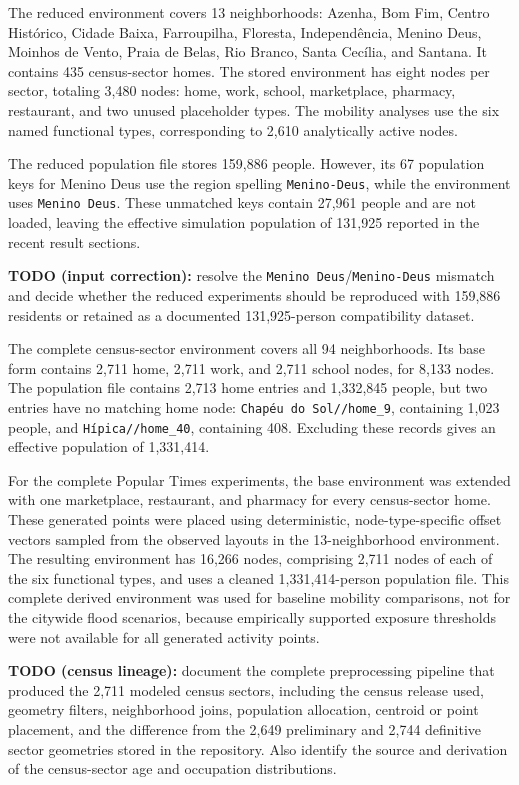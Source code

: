 The reduced environment covers 13 neighborhoods: Azenha, Bom Fim, Centro Hist\'orico, Cidade Baixa, Farroupilha, Floresta, Independ\^encia, Menino Deus, Moinhos de Vento, Praia de Belas, Rio Branco, Santa Cec\'ilia, and Santana. It contains 435 census-sector homes. The stored environment has eight nodes per sector, totaling 3,480 nodes: home, work, school, marketplace, pharmacy, restaurant, and two unused placeholder types. The mobility analyses use the six named functional types, corresponding to 2,610 analytically active nodes.

The reduced population file stores 159,886 people. However, its 67 population keys for Menino Deus use the region spelling \texttt{Menino-Deus}, while the environment uses \texttt{Menino Deus}. These unmatched keys contain 27,961 people and are not loaded, leaving the effective simulation population of 131,925 reported in the recent result sections.

{\color{red}\textbf{TODO (input correction):} resolve the \texttt{Menino Deus}/\texttt{Menino-Deus} mismatch and decide whether the reduced experiments should be reproduced with 159,886 residents or retained as a documented 131,925-person compatibility dataset.}

The complete census-sector environment covers all 94 neighborhoods. Its base form contains 2,711 home, 2,711 work, and 2,711 school nodes, for 8,133 nodes. The population file contains 2,713 home entries and 1,332,845 people, but two entries have no matching home node: \texttt{Chap\'eu do Sol//home\_9}, containing 1,023 people, and \texttt{H\'ipica//home\_40}, containing 408. Excluding these records gives an effective population of 1,331,414.

For the complete Popular Times experiments, the base environment was extended with one marketplace, restaurant, and pharmacy for every census-sector home. These generated points were placed using deterministic, node-type-specific offset vectors sampled from the observed layouts in the 13-neighborhood environment. The resulting environment has 16,266 nodes, comprising 2,711 nodes of each of the six functional types, and uses a cleaned 1,331,414-person population file. This complete derived environment was used for baseline mobility comparisons, not for the citywide flood scenarios, because empirically supported exposure thresholds were not available for all generated activity points.

{\color{red}\textbf{TODO (census lineage):} document the complete preprocessing pipeline that produced the 2,711 modeled census sectors, including the census release used, geometry filters, neighborhood joins, population allocation, centroid or point placement, and the difference from the 2,649 preliminary and 2,744 definitive sector geometries stored in the repository. Also identify the source and derivation of the census-sector age and occupation distributions.}

